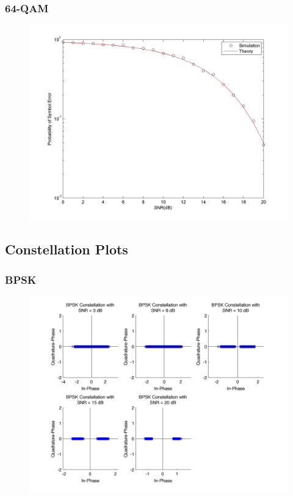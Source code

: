 \documentclass[]{article}
\begin{document}
\subsubsection{64-QAM}
\begin{figure}[H]
\centering
\includegraphics[width=\textwidth]{qam64SNR.jpg}
\caption{}
\end{figure}
\subsection{Constellation Plots}

\subsubsection{BPSK}
\begin{figure}[H]
\centering
\includegraphics[width=\textwidth]{bpConst.jpg}
\caption{}
\end{figure}
\end{document}
